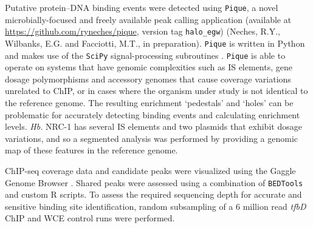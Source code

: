 Putative protein–DNA binding events were detected using {\tt Pique}, a novel microbially-focused and freely available peak calling application (available at \url{https://github.com/ryneches/pique}, version tag {\tt halo\_egw}) (Neches, R.Y., Wilbanks, E.G. and Facciotti, M.T., in preparation). {\tt Pique} is written in Python and makes use of the {\tt SciPy} signal-processing subroutines \cite{scipy}. {\tt Pique} is able to operate on systems that have genomic complexities such as IS elements, gene dosage polymorphisms and accessory genomes that cause coverage variations unrelated to ChIP, or in cases where the organism under study is not identical to the reference genome. The resulting enrichment `pedestals' and `holes' can be problematic for accurately detecting binding events and calculating enrichment levels. {\em Hb.} NRC-1 has several IS elements and two plasmids that exhibit dosage variations, and so a segmented analysis was performed by providing a genomic map of these features in the reference genome.

ChIP-seq coverage data and candidate peaks were visualized using the Gaggle Genome Browser \cite{bare_integration_2010}. Shared peaks were assessed using a combination of {\tt BEDTools} \cite{quinlan2010bedtools} and custom R scripts. To assess the required sequencing depth for accurate and sensitive binding site identification, random subsampling of a 6 million read  {\em tfbD}  ChIP and WCE control runs were performed.